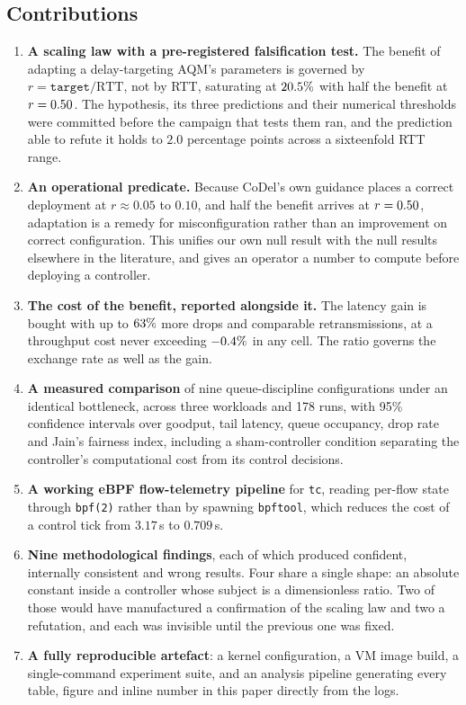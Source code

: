 \documentclass[conference]{IEEEtran}
\begin{document}
\subsection{Contributions}

\begin{enumerate}
\item \textbf{A scaling law with a pre-registered falsification test.} The
      benefit of adapting a delay-targeting AQM's parameters is governed by
      $r = \texttt{target}/\text{RTT}$, not by RTT, saturating at
      $20.5\%$ with half the benefit at $r = 0.50$. The
      hypothesis, its three predictions and their numerical thresholds were
      committed before the campaign that tests them ran, and the prediction
      able to refute it holds to $2.0$ percentage points across a sixteenfold
      RTT range.
\item \textbf{An operational predicate.} Because CoDel's own guidance places a
      correct deployment at $r \approx 0.05$ to $0.10$, and half the benefit
      arrives at $r = 0.50$, adaptation is a remedy for
      misconfiguration rather than an improvement on correct configuration.
      This unifies our own null result with the null results elsewhere in the
      literature, and gives an operator a number to compute before deploying a
      controller.
\item \textbf{The cost of the benefit, reported alongside it.} The latency gain
      is bought with up to $63\%$ more drops and comparable
      retransmissions, at a throughput cost never exceeding
      $-0.4\%$ in any cell. The ratio governs the exchange rate
      as well as the gain.
\item \textbf{A measured comparison} of nine queue-discipline configurations
      under an identical bottleneck, across three workloads and 178 runs, with
      95\% confidence intervals over goodput, tail latency, queue occupancy,
      drop rate and Jain's fairness index, including a sham-controller
      condition separating the controller's computational cost from its control
      decisions.
\item \textbf{A working eBPF flow-telemetry pipeline} for \texttt{tc}, reading
      per-flow state through \texttt{bpf(2)} rather than by spawning
      \texttt{bpftool}, which reduces the cost of a control tick from
      $3.17$\,s to $0.709$\,s.
\item \textbf{Nine methodological findings}, each of which produced confident,
      internally consistent and wrong results. Four share a single shape:
      an absolute constant inside a controller whose subject is a
      dimensionless ratio. Two of those would have manufactured a confirmation
      of the scaling law and two a refutation, and each was invisible until the
      previous one was fixed.
\item \textbf{A fully reproducible artefact}: a kernel configuration, a VM
      image build, a single-command experiment suite, and an analysis pipeline
      generating every table, figure and inline number in this paper directly
      from the logs.
\end{enumerate}
\end{document}
